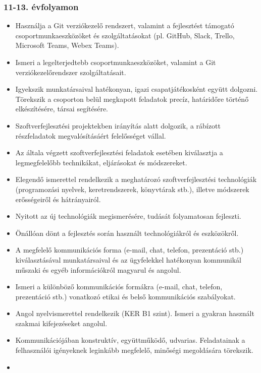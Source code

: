 \hypertarget{evfolyamon-9}{%
\subsubsection{11-13. évfolyamon}\label{evfolyamon-9}}

\begin{itemize}
\tightlist
\item
  Használja a Git verziókezelő rendszert, valamint a fejlesztést
  támogató csoportmunkaeszközöket és szolgáltatásokat (pl. GitHub,
  Slack, Trello, Microsoft Teams, Webex Teams).
\item
  Ismeri a legelterjedtebb csoportmunkaeszközöket, valamint a Git
  verziókezelőrendszer szolgáltatásait.
\item
  Igyekszik munkatársaival hatékonyan, igazi csapatjátékosként együtt
  dolgozni. Törekszik a csoporton belül megkapott feladatok precíz,
  határidőre történő elkészítésére, társai segítésére.
\item
  Szoftverfejlesztési projektekben irányítás alatt dolgozik, a rábízott
  részfeladatok megvalósításáért felelősséget vállal.
\item
  Az általa végzett szoftverfejlesztési feladatok esetében kiválasztja a
  legmegfelelőbb technikákat, eljárásokat és módszereket.
\item
  Elegendő ismerettel rendelkezik a meghatározó szoftverfejlesztési
  technológiák (programozási nyelvek, keretrendszerek, könyvtárak stb.),
  illetve módszerek erősségeiről és hátrányairól.
\item
  Nyitott az új technológiák megismerésére, tudását folyamatosan
  fejleszti.
\item
  Önállóan dönt a fejlesztés során használt technológiákról és
  eszközökről.
\item
  A megfelelő kommunikációs forma (e-mail, chat, telefon, prezentáció
  stb.) kiválasztásával munkatársaival és az ügyfelekkel hatékonyan
  kommunikál műszaki és egyéb információkról magyarul és angolul.
\item
  Ismeri a különböző kommunikációs formákra (e-mail, chat, telefon,
  prezentáció stb.) vonatkozó etikai és belső kommunikációs szabályokat.
\item
  Angol nyelvismerettel rendelkezik (KER B1 szint). Ismeri a gyakran
  használt szakmai kifejezéseket angolul.
\item
  Kommunikációjában konstruktív, együttműködő, udvarias. Feladatainak a
  felhasználói igényeknek leginkább megfelelő, minőségi megoldására
  törekszik.
\item

\end{itemize}
